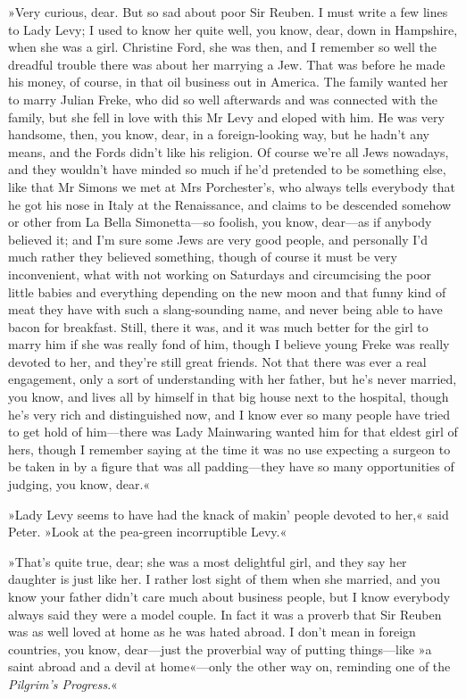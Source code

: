 »Very curious, dear. But so sad about poor Sir Reuben. I must write a few lines to Lady Levy; I used to know her quite well, you know, dear, down in Hampshire, when she was a girl. Christine Ford, she was then, and I remember so well the dreadful trouble there was about her marrying a Jew. That was before he made his money, of course, in that oil business out in America. The family wanted her to marry Julian Freke, who did so well afterwards and was connected with the family, but she fell in love with this Mr Levy and eloped with him. He was very handsome, then, you know, dear, in a foreign-looking way, but he hadn't any means, and the Fords didn't like his religion. Of course we're all Jews nowadays, and they wouldn't have minded so much if he'd pretended to be something else, like that Mr Simons we met at Mrs Porchester's, who always tells everybody that he got his nose in Italy at the Renaissance, and claims to be descended somehow or other from La Bella Simonetta\allowbreak---\allowbreak so foolish, you know, dear\allowbreak---\allowbreak as if anybody believed it; and I'm sure some Jews are very good people, and personally I'd much rather they believed something, though of course it must be very inconvenient, what with not working on Saturdays and circumcising the poor little babies and everything depending on the new moon and that funny kind of meat they have with such a slang-sounding name, and never being able to have bacon for breakfast. Still, there it was, and it was much better for the girl to marry him if she was really fond of him, though I believe young Freke was really devoted to her, and they're still great friends. Not that there was ever a real engagement, only a sort of understanding with her father, but he's never married, you know, and lives all by himself in that big house next to the hospital, though he's very rich and distinguished now, and I know ever so many people have tried to get hold of him\allowbreak---\allowbreak there was Lady Mainwaring wanted him for that eldest girl of hers, though I remember saying at the time it was no use expecting a surgeon to be taken in by a figure that was all padding\allowbreak---\allowbreak they have so many opportunities of judging, you know, dear.«

»Lady Levy seems to have had the knack of makin' people devoted to her,« said Peter. »Look at the pea-green incorruptible Levy.«

»That's quite true, dear; she was a most delightful girl, and they say her daughter is just like her. I rather lost sight of them when she married, and you know your father didn't care much about business people, but I know everybody always said they were a model couple. In fact it was a proverb that Sir Reuben was as well loved at home as he was hated abroad. I don't mean in foreign countries, you know, dear\allowbreak---\allowbreak just the proverbial way of putting things\allowbreak---\allowbreak like »a saint abroad and a devil at home«---only the other way on, reminding one of the \textit{Pilgrim's Progress}.«

